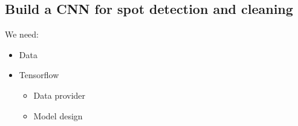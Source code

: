\documentclass[letterpaper,10pt,english]{sphinxmanual}
\begin{document}
\subsection{Build a CNN for spot detection and cleaning}
\label{\detokenize{ML4NeutronImageSegmentation:build-a-cnn-for-spot-detection-and-cleaning}}
We need:
\begin{itemize}
\item {} 
Data

\item {} 
Tensorflow
\begin{itemize}
\item {} 
Data provider

\item {} 
Model design

\end{itemize}

\end{itemize}
\end{document}
